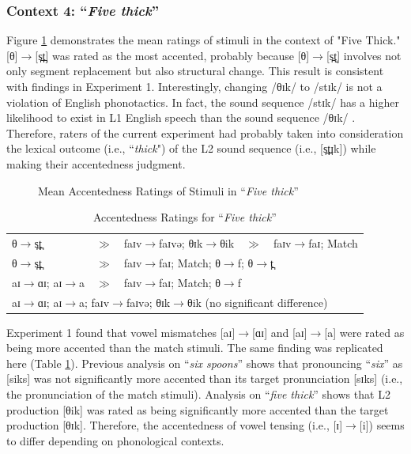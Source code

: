  \subsubsection{Context 4: “\textit{Five thick}”}
Figure \ref{fig:ft2} demonstrates the mean ratings of stimuli in the context of "Five Thick." 
[θ]$\rightarrow$[s̪t̪] was rated as the most accented, probably because [θ]$\rightarrow$[s̪t̝] involves not only segment replacement but also structural change. This result is consistent with findings in Experiment 1. Interestingly, changing /θɪk/ to /stɪk/ is not a violation of English phonotactics. In fact, the sound sequence /stɪk/ has a higher likelihood to exist in L1 English speech than the sound sequence /θɪk/ \citep{Vitevitch_2004}. Therefore, raters of the current experiment had probably taken into consideration the lexical outcome (i.e., ``\textit{thick}") of the L2 sound sequence (i.e., [s̪t̪ɪk]) while making their accentedness judgment. 

\begin{figure}[!h]
  \figSpace
\centering

\caption{Mean Accentedness Ratings of Stimuli in “\textit{Five thick}”}
\label{fig:ft2}
\figSpace
\end{figure}

\begin{table}[!h]
  \figSpace
  \centering
  \caption{Accentedness Ratings for “\textit{Five thick}” }
  \label{table:ft2}%
    \begin{tabular}{lclcl}
    \toprule
  θ$\rightarrow$s̪t̪   & $\gg$ &  faɪv$\rightarrow$faɪvə; θɪk$\rightarrow$θik&$\gg$& faɪv$\rightarrow$faɪ;  Match\\
    θ$\rightarrow$s̪t̪ &$\gg$& \multicolumn{3}{l}{faɪv$\rightarrow$faɪ; Match; θ$\rightarrow$f;  θ$\rightarrow$t̪}\\
    aɪ$\rightarrow$ɑɪ; aɪ$\rightarrow$a&$\gg$& \multicolumn{3}{l}{faɪv$\rightarrow$faɪ; Match; θ$\rightarrow$f} \\
    \multicolumn{5}{l}{aɪ$\rightarrow$ɑɪ; aɪ$\rightarrow$a; faɪv$\rightarrow$faɪvə; θɪk$\rightarrow$θik (no significant difference)}\\
    \bottomrule
    \end{tabular}%
      \figSpace
\end{table}%

Experiment 1 found that vowel mismatches [aɪ]$\rightarrow$[ɑɪ] and [aɪ]$\rightarrow$[a] were rated as being more accented than the match stimuli. The same finding was replicated here (Table \ref{table:ft2}). Previous analysis on “\textit{six spoons}” shows that pronouncing “\textit{six}” as [siks] was not significantly more accented than its target pronunciation [sɪks] (i.e., the pronunciation of the match stimuli). Analysis on “\textit{five thick}” shows that L2 production [θik] was rated as being significantly more accented than the target production [θɪk]. Therefore, the accentedness of vowel tensing (i.e., [ɪ]$\rightarrow$[i]) seems to differ depending on phonological contexts.



